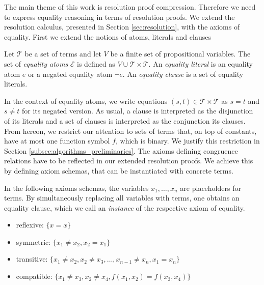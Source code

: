 The main theme of this work is resolution proof compression.
Therefore we need to express equality reasoning in terms of resolution proofs.
We extend the resolution calculus, presented in Section \ref{sec:resolution}, with the axioms of equality.
First we extend the notions of atoms, literals and clauses

\begin{definition}

Let $\mathcal{T}$ be a set of terms and let $V$ be a finite set of propositional variables.
The set of \emph{equality atoms} $\mathcal{E}$ is defined as $V \cup \mathcal{T} \times \mathcal{T}$.
An \emph{equality literal} is an equality atom $e$ or a negated equality atom $\neg e$.
An \emph{equality clause} is a set of equality literals.

\end{definition}

In the context of equality atoms, we write equations $(s,t) \in \mathcal{T} \times \mathcal{T}$ as $s = t$ and $s \neq t$ for its negated version.
As usual, a clause is interpreted as the disjunction of its literals and a set of clauses is interpreted as the conjunction its clauses.\\

From hereon, we restrict our attention to sets of terms that, on top of constants, have at most one function symbol $f$, which is binary.
We justify this restriction in Section \ref{subsec:algorithms_preliminaries}.
The axioms defining congruence relations have to be reflected in our extended resolution proofs.
We achieve this by defining axiom schemas, that can be instantiated with concrete terms.

\begin{definition}

In the following axioms schemas, the variables $x_1,\ldots,x_n$ are placeholders for terms.
By simultaneously replacing all variables with terms, one obtains an equality clause, which we call an \emph{instance} of the respective axiom of equality.

\begin{itemize}
	\item reflexive: $\{x = x\}$
	\item symmetric: $\{x_1 \neq x_2, x_2 = x_1\}$
	\item transitive: $\{x_1 \neq x_2, x_2 \neq x_3, \ldots, x_{n-1} \neq x_n, x_1 = x_n\}$
	\item compatible: $\{x_1 \neq x_3, x_2 \neq x_4, f(x_1,x_2) = f(x_3,x_4)\}$
\end{itemize}

\end{definition}

